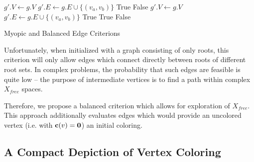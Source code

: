 \begin{algorithm}[t!]
\begin{algorithmic}[1]
\State $g'.V \leftarrow g.V$
\State $g'.E \leftarrow g.E \cup \{(v_a, v_b)\}$
\State \Return True
\Else
\State \Return False
\EndIf
\EndFunction
{}%
\State $g'.V \leftarrow g.V$
\State $g'.E \leftarrow g.E \cup \{(v_a, v_b)\}$
\State \Return True
\State \Return True
\Else
\State \Return False
\EndIf
\EndFunction
\end{algorithmic}
\caption{Myopic and Balanced Edge Criterions}
\label{alg:criterion}
\end{algorithm}

Unfortunately, when initialized with a graph consisting of only
roots,
this criterion will only allow edges which connect directly
between roots of different root sets.
In complex problems, the probability that such edges are feasible
is quite low --
the purpose of intermediate vertices is to find a path within
complex $X_{free}$ spaces.

Therefore, we propose a balanced criterion which allows for exploration
of $X_{free}$.
This approach additionally evaluates edges which would provide an
uncolored vertex (i.e. with ${\bf c}(v) = {\bf 0}$) an initial coloring.

\subsection{A Compact Depiction of Vertex Coloring}


